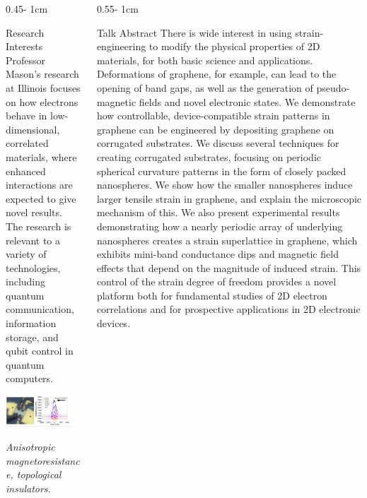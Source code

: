 \documentclass{../psuposter}
\begin{document}
\begin{frame}
\begin{columns}[t, totalwidth=\textwidth]
\begin{column}{0.45\textwidth - 1cm}
    \begin{block}{Research Interests}
        Professor Mason's research at Illinois focuses on how electrons behave in low-dimensional, correlated materials, where enhanced interactions are expected to give novel results. The research is relevant to a variety of technologies, including quantum communication, information storage, and qubit control in quantum computers. 
        \begin{center}
	    	\includegraphics[width=0.85\textwidth]{images/research}    		
    	
    	\textit{Anisotropic magnetoresistance, topological insulators. \cite{masonMasonGroupResearch}} 
    	\end{center}
    	
    \end{block}
\end{column}
\begin{column}{0.55\textwidth - 1cm}


    \begin{block}{Talk Abstract}
    	There is wide interest in using strain-engineering to modify the physical properties of 2D materials, for both basic science and applications. Deformations of graphene, for example, can lead to the opening of band gaps, as well as the generation of pseudo-magnetic fields and novel electronic states. We demonstrate how controllable, device-compatible strain patterns in graphene can be engineered by depositing graphene on corrugated substrates. We discuss several techniques for creating corrugated substrates, focusing on periodic spherical curvature patterns in the form of closely packed nanospheres. We show how the smaller nanospheres induce larger tensile strain in graphene, and explain the microscopic mechanism of this. We also present experimental results demonstrating how a nearly periodic array of underlying nanospheres creates a strain superlattice in graphene, which exhibits mini-band conductance dips and magnetic field effects that depend on the magnitude of induced strain. This control of the strain degree of freedom provides a novel platform both for fundamental studies of 2D electron correlations and for prospective applications in 2D electronic devices.
    \end{block}



\end{column}
\end{columns}
\end{frame}
\end{document}

